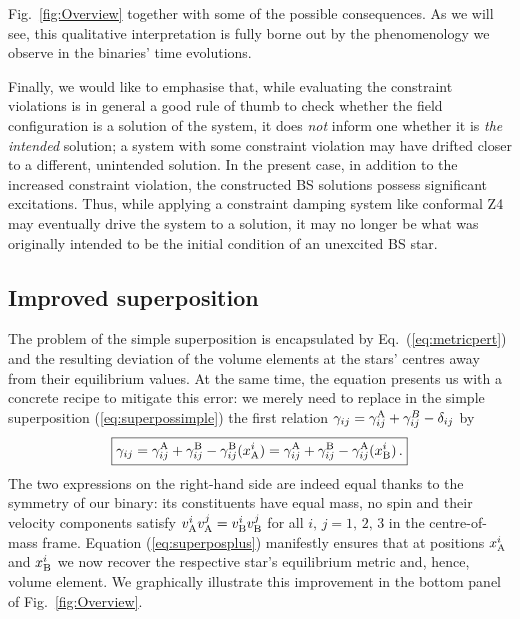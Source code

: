 \documentclass[]{iopart}
\begin{document}
%
Fig.~\ref{fig:Overview} together with some of the possible consequences.
As we will see, this qualitative interpretation is fully borne out
by the phenomenology we observe in the binaries' time evolutions.

Finally, we would like to emphasise that, while evaluating the
constraint violations is in general a good rule of thumb to check
whether the field configuration is a solution of the system, it
does \emph{not} inform one whether it is \emph{the intended} solution;
a system with some constraint violation may have drifted closer to
a different, unintended solution. In the present case, in addition
to the  increased constraint violation, the constructed BS solutions
possess significant excitations. Thus, while applying a constraint
damping system like conformal Z4 \cite{Bernuzzi:2009ex,Alic:2011gg}
may eventually drive the system to a solution, it may no longer be
what was originally intended to be the initial condition of an
unexcited BS star.


\subsection{Improved superposition}
%
The problem of the simple superposition is encapsulated by
Eq.~(\ref{eq:metricpert}) and the resulting deviation of the volume
elements at the stars' centres away from their equilibrium values.
At the same time, the equation presents us with a concrete recipe
to mitigate this error: we merely need to replace in the simple
superposition (\ref{eq:superpossimple}) the first relation
$\gamma_{ij}=\gamma_{ij}^{\rm A}+\gamma_{ij}^B -\delta_{ij}$ by
%
\begin{equation}
  \boxed{
  \gamma_{ij}=\gamma_{ij}^{\rm A}+\gamma_{ij}^{\rm B}
  -\gamma_{ij}^{\rm B}(x^i_{\rm A})
  =\gamma_{ij}^{\rm A}+\gamma_{ij}^{\rm B}
  -\gamma_{ij}^{\rm A}(x^i_{\rm B})\,.}
  \label{eq:superposplus}
\end{equation}
%
The two expressions on the right-hand side are indeed equal thanks
to the symmetry of our binary: its constituents have equal mass,
no spin and their velocity components satisfy $v_{\rm A}^i v_{\rm
A}^j=v_{\rm B}^i v_{\rm B}^j$ for all $i,\,j=1,\,2,\,3$ in the
centre-of-mass frame.  Equation (\ref{eq:superposplus}) manifestly
ensures that at positions $x_{\rm A}^i$ and $x_{\rm B}^i$ we now
recover the respective star's equilibrium metric and, hence, volume
element.  We graphically illustrate this improvement in the bottom
panel of Fig.~\ref{fig:Overview}.
\end{document}
